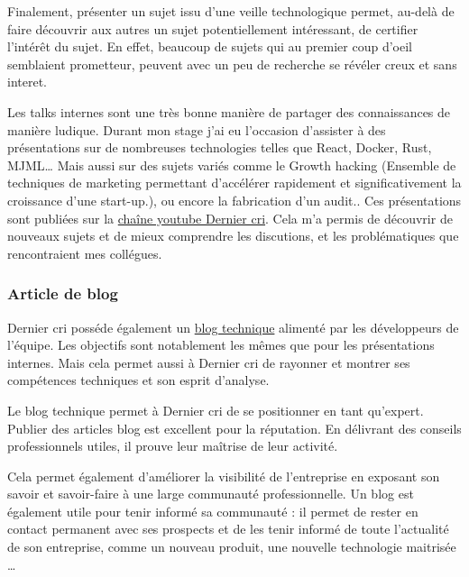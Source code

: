 \bigskip

Finalement, présenter un sujet issu d'une veille technologique permet,
au-delà de faire découvrir aux autres un sujet potentiellement
intéressant, de certifier l'intérêt du sujet. En effet, beaucoup de
sujets qui au premier coup d'oeil semblaient prometteur, peuvent avec un
peu de recherche se révéler creux et sans interet.

\bigskip

Les talks internes sont une très bonne manière de partager des
connaissances de manière ludique. Durant mon stage j'ai eu l'occasion
d'assister à des présentations sur de nombreuses technologies telles que
React, Docker, Rust, MJML\ldots{} Mais aussi sur des sujets variés comme
le Growth hacking (Ensemble de techniques de marketing permettant
d'accélérer rapidement et significativement la croissance d'une
start-up.), ou encore la fabrication d'un audit.. Ces présentations sont
publiées sur la
\href{https://www.youtube.com/channel/UCDfdBlzldhg_PEu3xZTPsHg}{chaîne
youtube Dernier cri}. Cela m'a permis de découvrir de nouveaux sujets et
de mieux comprendre les discutions, et les problématiques que
rencontraient mes collégues.

\bigskip

\subsubsection{Article de blog}\label{article-de-blog}

\bigskip

Dernier cri posséde également un
\href{http://derniercri.io/tech-blog}{blog technique} alimenté par les
développeurs de l'équipe. Les objectifs sont notablement les mêmes que
pour les présentations internes. Mais cela permet aussi à Dernier cri de
rayonner et montrer ses compétences techniques et son esprit d'analyse.

\bigskip

Le blog technique permet à Dernier cri de se positionner en tant
qu'expert. Publier des articles blog est excellent pour la réputation.
En délivrant des conseils professionnels utiles, il prouve leur maîtrise
de leur activité.

\bigskip

Cela permet également d'améliorer la visibilité de l'entreprise en
exposant son savoir et savoir-faire à une large communauté
professionnelle. Un blog est également utile pour tenir informé sa
communauté : il permet de rester en contact permanent avec ses prospects
et de les tenir informé de toute l'actualité de son entreprise, comme un
nouveau produit, une nouvelle technologie maitrisée \ldots{}

